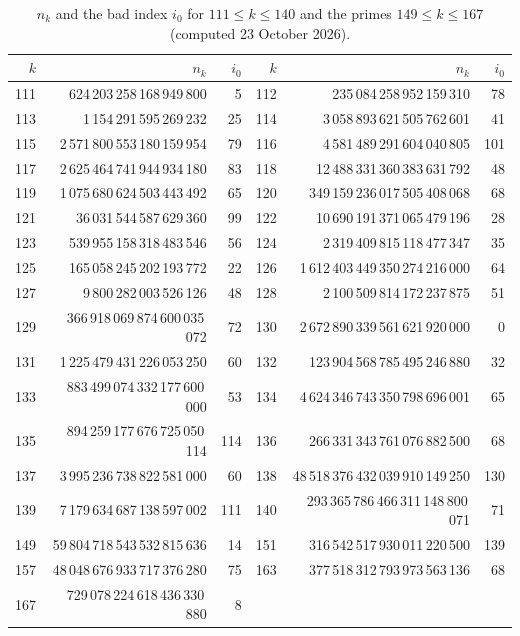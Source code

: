 \documentclass[11pt]{amsart}
\theoremstyle{remark}
\begin{document}
\begin{table}[h]
\caption{$n_k$ and the bad index $i_0$ for $111\le k\le140$ and the primes $149\le k\le167$ (computed 23 October 2026).}\label{tab:values2}
\footnotesize
\begin{tabular}{rrr@{\qquad}rrr}
\toprule
$k$ & $n_k$ & $i_0$ & $k$ & $n_k$ & $i_0$\\
\midrule
111 & 624\,203\,258\,168\,949\,800 & 5 & 112 & 235\,084\,258\,952\,159\,310 & 78 \\
113 & 1\,154\,291\,595\,269\,232 & 25 & 114 & 3\,058\,893\,621\,505\,762\,601 & 41 \\
115 & 2\,571\,800\,553\,180\,159\,954 & 79 & 116 & 4\,581\,489\,291\,604\,040\,805 & 101 \\
117 & 2\,625\,464\,741\,944\,934\,180 & 83 & 118 & 12\,488\,331\,360\,383\,631\,792 & 48 \\
119 & 1\,075\,680\,624\,503\,443\,492 & 65 & 120 & 349\,159\,236\,017\,505\,408\,068 & 68 \\
121 & 36\,031\,544\,587\,629\,360 & 99 & 122 & 10\,690\,191\,371\,065\,479\,196 & 28 \\
123 & 539\,955\,158\,318\,483\,546 & 56 & 124 & 2\,319\,409\,815\,118\,477\,347 & 35 \\
125 & 165\,058\,245\,202\,193\,772 & 22 & 126 & 1\,612\,403\,449\,350\,274\,216\,000 & 64 \\
127 & 9\,800\,282\,003\,526\,126 & 48 & 128 & 2\,100\,509\,814\,172\,237\,875 & 51 \\
129 & 366\,918\,069\,874\,600\,035\,072 & 72 & 130 & 2\,672\,890\,339\,561\,621\,920\,000 & 0 \\
131 & 1\,225\,479\,431\,226\,053\,250 & 60 & 132 & 123\,904\,568\,785\,495\,246\,880 & 32 \\
133 & 883\,499\,074\,332\,177\,600\,000 & 53 & 134 & 4\,624\,346\,743\,350\,798\,696\,001 & 65 \\
135 & 894\,259\,177\,676\,725\,050\,114 & 114 & 136 & 266\,331\,343\,761\,076\,882\,500 & 68 \\
137 & 3\,995\,236\,738\,822\,581\,000 & 60 & 138 & 48\,518\,376\,432\,039\,910\,149\,250 & 130 \\
139 & 7\,179\,634\,687\,138\,597\,002 & 111 & 140 & 293\,365\,786\,466\,311\,148\,800\,071 & 71 \\
149 & 59\,804\,718\,543\,532\,815\,636 & 14 & 151 & 316\,542\,517\,930\,011\,220\,500 & 139 \\
157 & 48\,048\,676\,933\,717\,376\,280 & 75 & 163 & 377\,518\,312\,793\,973\,563\,136 & 68 \\
167 & 729\,078\,224\,618\,436\,330\,880 & 8 & & & \\
\bottomrule
\end{tabular}
\end{table}
\end{document}
